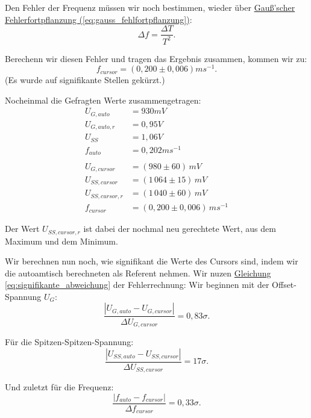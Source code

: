 Den Fehler der Frequenz müssen wir noch bestimmen, wieder über \hyperref[eq:gauss_fehlfortpflanzung]{Gauß'scher Fehlerfortpflanzung (\ref*{eq:gauss_fehlfortpflanzung})}:
\begin{equation}
    \Delta f = \frac{\Delta T}{T^2}.
    \label{eq:f_freq}
\end{equation}

Berechenn wir diesen Fehler und tragen das Ergebnis zusammen, kommen wir zu: 
\begin{equation}
    \boxed{
        f_{cursor} = (0,200 \pm 0,006) ms^{-1}
    }.
\end{equation}
(Es wurde auf signifikante Stellen gekürzt.)


Nocheinmal die Gefragten Werte zusammengetragen:
\begin{align*}
    U_{G,auto} &= 930 mV \\
    U_{G,auto,r} &= 0,95 V \\
    U_{SS} &= 1,06 V \\
    f_{auto} &= 0,202 ms^{-1} \\
    \\
    U_{G,cursor}& = (980 \pm 60)\, mV \\
    U_{SS,cursor} &= (1\,064 \pm 15)\, mV \\
    U_{SS,cursor,r} &= (1\,040 \pm 60)\, mV \\
    f_{cursor} &= (0,200 \pm 0,006)\, ms^{-1}
\end{align*}

Der Wert $U_{SS,cursor,r}$ ist dabei der nochmal neu gerechtete Wert, aus dem Maximum und dem Minimum. 

Wir berechnen nun noch, wie signifikant die Werte des Cursors sind, indem wir die autoamtisch berechneten als Referent nehmen. Wir nuzen \hyperref[eq:signifikante_abweichung]{Gleichung \ref*{eq:signifikante_abweichung}} der Fehlerrechnung:
Wir beginnen mit der Offset-Spannung $U_G$:
\begin{equation}
    \frac{\left| U_{G,auto} - U_{G,cursor} \right|}{\Delta U_{G,cursor}} = 0,83\sigma.
\end{equation}

Für die Spitzen-Spitzen-Spannung:
\begin{equation}
    \frac{\left| U_{SS,auto} - U_{SS,cursor} \right|}{\Delta U_{SS,cursor}} = 17\sigma.
\end{equation}

Und zuletzt für die Frequenz:
\begin{equation}
    \frac{\left| f_{auto} - f_{cursor} \right|}{\Delta f_{cursor}} = 0,33\sigma.
\end{equation}


